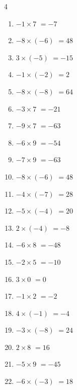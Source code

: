 \begin{multicols}{4}
\begin{enumerate}
  \item $-1\times 7$
        $=-7$

  \item $-8\times (-6)$
        $=48$

  \item $3\times (-5)$
        $=-15$

  \item $-1\times (-2)$
        $=2$

  \item $-8\times (-8)$
        $=64$

  \item $-3\times 7$
        $=-21$

  \item $-9\times 7$
        $=-63$

  \item $-6\times 9$
        $=-54$

  \item $-7\times 9$
        $=-63$

  \item $-8\times (-6)$
        $=48$

  \item $-4\times (-7)$
        $=28$

  \item $-5\times (-4)$
        $=20$

  \item $2\times (-4)$
        $=-8$

  \item $-6\times 8$
        $=-48$

  \item $-2\times 5$
        $=-10$

  \item $3\times 0$
        $=0$

\columnbreak %

  \item $-1\times 2$
        $=-2$

  \item $4\times (-1)$
        $=-4$

  \item $-3\times (-8)$
        $=24$

  \item $2\times 8$
        $=16$

  \item $-5\times 9$
        $=-45$

  \item $-6\times (-3)$
        $=18$


\end{enumerate}
\end{multicols}
